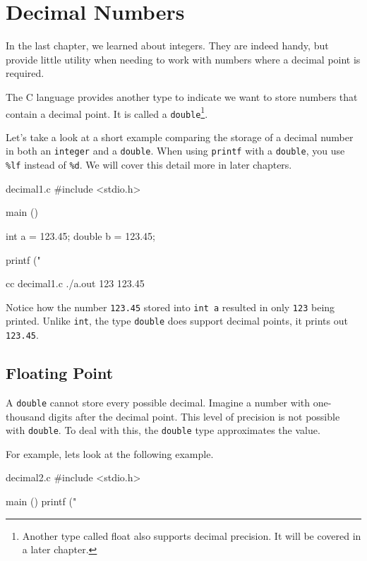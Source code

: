 \chapter{Decimal Numbers}

In the last chapter, we learned about integers. They are indeed handy, but
provide little utility when needing to work with numbers where a decimal point
is required.

The C language provides another type to indicate we want to store numbers that
contain a decimal point. It is called a \verb|double|\footnote{Another type
called float also supports decimal precision. It will be covered in a later
chapter.}.

Let's take a look at a short example comparing the storage of a decimal number
in both an \verb|integer| and a \verb|double|. When using \verb|printf| with a
\verb|double|, you use \verb|%lf| instead of \verb|%d|. We will cover this
detail more in later chapters.

\begin{code}{decimal1.c}
#include <stdio.h>

main ()
{
    int a = 123.45;
    double b = 123.45;

    printf ("%
}
\end{code}

\begin{Terminal}
cc decimal1.c
./a.out
123 123.45
\end{Terminal}

Notice how the number \verb|123.45| stored into \verb|int a| resulted in only
\verb|123| being printed. Unlike \verb|int|, the type \verb|double| does
support decimal points, it prints out \verb|123.45|.


\section{Floating Point}

A \verb|double| cannot store every possible decimal. Imagine a number with
one-thousand digits after the decimal point. This level of precision is not
possible with \verb|double|. To deal with this, the \verb|double| type
approximates the value.

For example, lets look at the following example.

\begin{code}{decimal2.c}
#include <stdio.h>

main ()
{
    printf ("%
}
\end{code}

